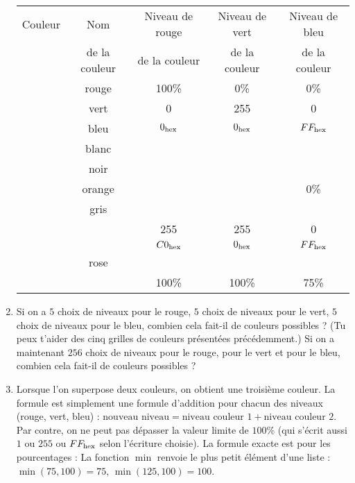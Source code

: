 \documentclass[class=report,crop=false, 12pt]{standalone}
\begin{document}
\begin{activite}
\begin{enumerate}
\begin{center}
\begin{tabular}{|c|c|c|c|c|}
\hline
Couleur & Nom & Niveau de rouge & Niveau de vert & Niveau de bleu \\ 
& de la couleur & de la couleur  & de la couleur  & de la couleur  \\ \hline
\cellcolor{red}  & rouge  & 100\% & 0\% & 0\% \\ \hline
\cellcolor{green}& vert  & 0 & 255 & 0 \\ \hline
\cellcolor{blue} & bleu   & $0_{\text{hex}}$ & $0_{\text{hex}}$ & $FF_{\text{hex}}$ \\ \hline
                 & blanc  &  &  &   \\ \hline
                 & noir   &  &  &   \\ \hline
                 & orange &  &  & 0\% \\ \hline  
                 & gris   &  &  &     \\ \hline
                 &        & 255 & 255 & 0 \\ \hline
                 &        & $C0_{\text{hex}}$ & $0_{\text{hex}}$ & $FF_{\text{hex}}$ \\ \hline
                 & rose   &  &  &   \\ \hline
                 &        & 100\% & 100\% & 75\% \\ \hline
\end{tabular}
\end{center} 
  
  \item Si on a $5$ choix de niveaux pour le rouge, $5$ choix de niveaux pour le vert, $5$ choix de niveaux pour le bleu, combien cela fait-il de couleurs possibles ? (Tu peux t'aider des cinq grilles de couleurs présentées précédemment.) Si on a maintenant $256$ choix de niveaux pour le rouge, pour le vert et pour le bleu, combien cela fait-il de couleurs possibles ?
  
  
  \item Lorsque l'on superpose deux couleurs, on obtient une troisième couleur. La formule est simplement une formule d'addition pour chacun des niveaux (rouge, vert, bleu) : $\text{nouveau niveau} = \text{niveau couleur 1} + \text{niveau couleur 2}$.
Par contre, on ne peut pas dépasser la valeur limite de $100\%$ (qui s'écrit aussi $1$ ou $255$ 
ou $FF_{\text{hex}}$ selon l'écriture choisie).
La formule exacte est pour les pourcentages :
 La fonction \og $\min$ \fg{} renvoie le plus petit élément d'une liste : $\min(75,100)= 75$, $\min(125,100)=100$.


\end{enumerate}
\end{activite}
\end{document}
